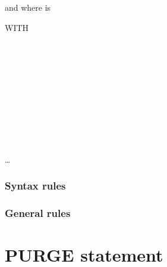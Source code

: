and where  is

\begin{syntax}
  \begin{0-1}
    WITH 
    \begin{1=}
       \\
       \\
    \end{1=}
  \end{0-1}

   \identifier {}
  \begin{1=}
    \identifier \\
    \literal
  \end{1=}
  \begin{1=}
    \identifier \\
    \literal
  \end{1=}
  \condition

  \begin{0-1}
     \identifier {}
    \begin{1=}
      \identifier \\
      \literal
    \end{1=}
    \begin{1=}
      \identifier \\
      \literal
    \end{1=}

    \condition
  \end{0-1} \ldots
\end{syntax}


\subsubsection{Syntax rules}

\subsubsection{General rules}

\section{PURGE statement}

\begin{syntax}[\deletedcolour]
\end{syntax}

